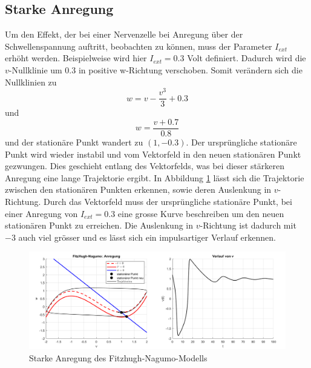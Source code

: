 \begin{refsection}
\subsection{Starke Anregung}
Um den Effekt, der bei einer Nervenzelle bei Anregung über der Schwellenspannung auftritt, beobachten zu können, muss
der Parameter $I_{ext}$ erhöht werden.
Beispielweise wird hier $I_{ext} = 0.3$ Volt definiert.
Dadurch wird die $v$-Nullklinie um 0.3 in positive w-Richtung verschoben.
Somit verändern sich die Nullklinien zu 
\[ w = v - \frac{v^3}{3} + 0.3\]
und \[w = \frac{v + 0.7}{0.8}\] und der stationäre Punkt wandert zu $(1 ,-0.3)$.
Der ursprüngliche stationäre Punkt wird wieder instabil und vom Vektorfeld in den neuen stationären Punkt
gezwungen.
Dies geschieht entlang des Vektorfelds, was bei dieser stärkeren Anregung eine lange Trajektorie ergibt.
In Abbildung \ref{fig:starkeAnregung} lässt sich die Trajektorie zwischen den stationären Punkten erkennen, sowie
deren Auslenkung in $v$-Richtung.
Durch das Vektorfeld muss der ursprüngliche stationäre Punkt, bei einer Anregung von $I_{ext} = 0.3$ eine grosse Kurve
beschreiben um den neuen stationären Punkt zu erreichen.
Die Auslenkung in $v$-Richtung ist dadurch mit $-3$ auch viel grösser und es lässt sich ein impulsartiger Verlauf erkennen.
\begin{figure}[H]
    \centering
    \includegraphics[width=\textwidth]{papers/nerven/Bilder/starkeAnregung.png}
    \caption{Starke Anregung des Fitzhugh-Nagumo-Modells}
    \label{fig:starkeAnregung}
\end{figure}

\end{refsection}

